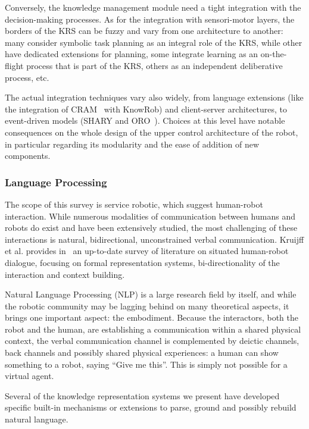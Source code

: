 \documentclass[a4paper, twocolumn]{article}
\begin{document}
Conversely, the knowledge management module need a tight integration with the
decision-making processes. As for the integration with sensori-motor
layers, the borders of the KRS can be fuzzy and vary from one architecture to
another: many consider symbolic task planning as an integral role of the KRS,
while other have dedicated extensions for planning, some integrate learning as
an on-the-flight process that is part of the KRS, others as an independent
deliberative process, etc.

The actual integration techniques vary also widely, from language extensions
(like the integration of CRAM~\cite{Beetz2010} with KnowRob) and client-server
architectures, to event-driven models (SHARY and ORO~\cite{Alami2011}). Choices
at this level have notable consequences on the whole design of the upper
control architecture of the robot, in particular regarding its modularity and
the ease of addition of new components.

\subsubsection{Language Processing}
\label{sect|nlp}

The scope of this survey is service robotic, which suggest human-robot
interaction. While numerous modalities of communication between humans and
robots do exist and have been extensively studied, the most challenging of
these interactions is natural, bidirectional, unconstrained verbal
communication. Kruijff et al. provides in~\cite{Kruijff2010} an up-to-date
survey of literature on situated human-robot dialogue, focusing on formal
representation systems, bi-directionality of the interaction and context
building.

Natural Language Processing (NLP) is a large research field by itself, and
while the robotic community may be lagging behind on many theoretical aspects,
it brings one important aspect: the embodiment. Because the interactors, both
the robot and the human, are establishing a communication within a shared
physical context, the verbal communication channel is complemented by deictic
channels, back channels and possibly shared physical experiences: a human can
show something to a robot, saying ``Give me this''. This is simply not possible
for a virtual agent.

Several of the knowledge representation systems we present have developed
specific built-in mechanisms or extensions to parse, ground and possibly
rebuild natural language.
\end{document}
